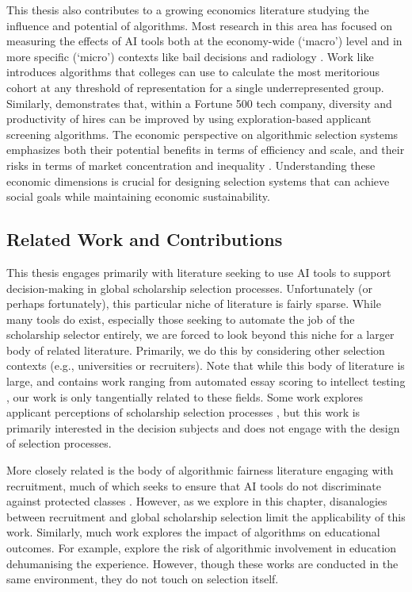 This thesis also contributes to a growing economics literature studying the influence and potential of algorithms. Most research in this area has focused on measuring the effects of AI tools both at the economy-wide (`macro') level \cite{acemoglu2022automation,babina2024artificial} and in more specific (`micro') contexts like bail decisions and radiology \cite{albright2023hidden,kleinberg2015prediction,stevenson2019algorithmic}. Work like \textcite{kleinberg2018algorithmic} introduces algorithms that colleges can use to calculate the most meritorious cohort at any threshold of representation for a single underrepresented group. Similarly, \textcite{li2020hiring} demonstrates that, within a Fortune 500 tech company, diversity and productivity of hires can be improved by using exploration-based applicant screening algorithms. The economic perspective on algorithmic selection systems emphasizes both their potential benefits in terms of efficiency and scale, and their risks in terms of market concentration and inequality \cite{autor2020work}. Understanding these economic dimensions is crucial for designing selection systems that can achieve social goals while maintaining economic sustainability.

\subsection{Related Work and Contributions}\label{ssec:context_related_work}
This thesis engages primarily with literature seeking to use AI tools to support decision-making in global scholarship selection processes. Unfortunately (or perhaps fortunately), this particular niche of literature is fairly sparse. While many tools do exist, especially those seeking to automate the job of the scholarship selector entirely, we are forced to look beyond this niche for a larger body of related literature. Primarily, we do this by considering other selection contexts (e.g., universities or recruiters). Note that while this body of literature is large, and contains work ranging from automated essay scoring to intellect testing \cite{cozma_automated_2018,condon2014international}, our work is only tangentially related to these fields. Some work explores applicant perceptions of scholarship selection processes \cite{10.1145/3351095.3372867}, but this work is primarily interested in the decision subjects and does not engage with the design of selection processes.

More closely related is the body of algorithmic fairness literature engaging with recruitment, much of which seeks to ensure that AI tools do not discriminate against protected classes \cite{dwork_fairness_2012}. However, as we explore in this chapter, disanalogies between recruitment and global scholarship selection limit the applicability of this work. Similarly, much work explores the impact of algorithms on educational outcomes. For example, \textcite{NISSENBAUM1998237} explore the risk of algorithmic involvement in education dehumanising the experience. However, though these works are conducted in the same environment, they do not touch on selection itself.

